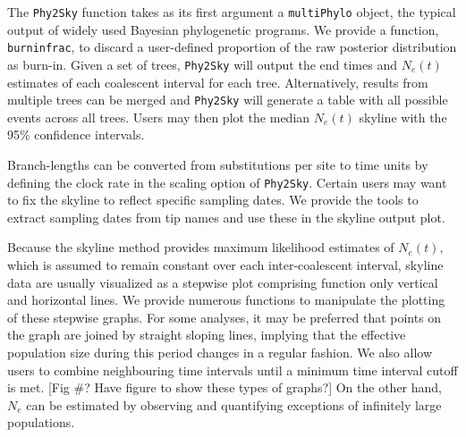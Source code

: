 \documentclass[english,titlepage]{article}
\begin{document}
The \texttt{Phy2Sky} function takes as its first argument a \texttt{multiPhylo} object, the typical output of widely used Bayesian phylogenetic programs. We provide a function, \texttt{burninfrac}, to discard a user-defined proportion of the raw posterior distribution as burn-in. Given a set of trees, \texttt{Phy2Sky} will output the end times and $N_e(t)$ estimates of each coalescent interval for each tree. Alternatively, results from multiple trees can be merged and \texttt{Phy2Sky} will generate a table with all possible events across all trees. Users may then plot the median $N_e(t)$ skyline with the 95\% confidence intervals.

Branch-lengths can be converted from substitutions per site to time units by defining the clock rate in the scaling option of \texttt{Phy2Sky}. Certain users may want to fix the skyline to reflect specific sampling dates. We provide the tools to extract sampling dates from tip names and use these in the skyline output plot.

Because the skyline method provides maximum likelihood estimates of $N_e(t)$, which is assumed to remain constant over each inter-coalescent interval, skyline data are usually visualized as a stepwise plot comprising function only vertical and horizontal lines. We provide numerous functions to manipulate the plotting of these stepwise graphs. For some analyses, it may be preferred that points on the graph are joined by straight sloping lines, implying that the effective population size during this period changes in a regular fashion. We also allow users to combine neighbouring time intervals until a minimum time interval cutoff is met. [Fig \#? Have figure to show these types of graphs?] On the other hand, $N_e$ can be estimated by observing and quantifying exceptions of infinitely large populations. 

  
\end{document}
